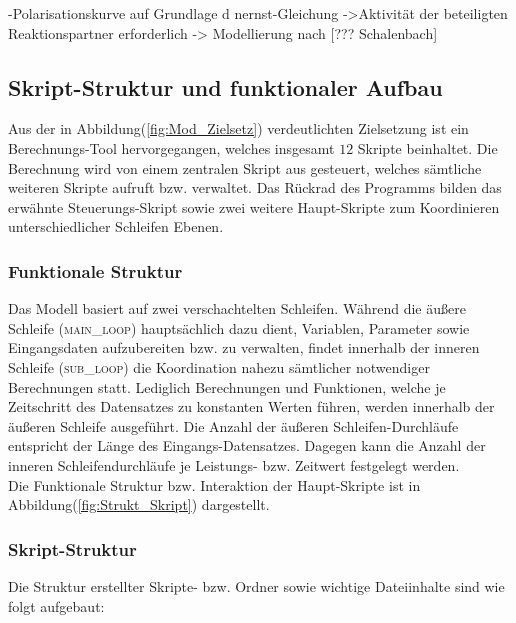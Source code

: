 \documentclass[onecolumn,10pt,titlepage]{article}
\begin{document}



-Polarisationskurve auf Grundlage d nernst-Gleichung
->Aktivität der beteiligten Reaktionspartner erforderlich
->
Modellierung nach [??? Schalenbach]



\subsection{Skript-Struktur und funktionaler Aufbau}
\label{subs_Skript-Strukt}
Aus der in Abbildung(\ref{fig:Mod_Zielsetz}) verdeutlichten Zielsetzung ist ein Berechnungs-Tool hervorgegangen, welches insgesamt $12$ Skripte beinhaltet.
Die Berechnung wird von einem zentralen Skript aus gesteuert, welches sämtliche weiteren Skripte aufruft bzw. verwaltet. Das Rückrad des Programms bilden das erwähnte Steuerungs-Skript sowie zwei weitere Haupt-Skripte zum Koordinieren unterschiedlicher Schleifen Ebenen. 

\subsubsection{Funktionale Struktur}
\label{subs_Funkt-Strukt}
Das Modell basiert auf zwei verschachtelten Schleifen. Während die äußere Schleife (\textsc{main\_loop}) hauptsächlich dazu dient, Variablen, Parameter sowie Eingangsdaten aufzubereiten bzw. zu verwalten, findet innerhalb der inneren Schleife (\textsc{sub\_loop}) die Koordination nahezu sämtlicher notwendiger Berechnungen statt. Lediglich Berechnungen und Funktionen, welche je Zeitschritt des Datensatzes zu konstanten Werten führen, werden innerhalb der äußeren Schleife ausgeführt. Die Anzahl der äußeren Schleifen-Durchläufe entspricht der Länge des Eingangs-Datensatzes. Dagegen kann die Anzahl der inneren Schleifendurchläufe je Leistungs- bzw. Zeitwert festgelegt werden.\\

Die Funktionale Struktur bzw. Interaktion der Haupt-Skripte ist in Abbildung(\ref{fig:Strukt_Skript}) dargestellt. 

\subsubsection{Skript-Struktur}
\label{subsubs_skrpt-strukt}
Die Struktur erstellter Skripte- bzw. Ordner sowie wichtige Dateiinhalte sind wie folgt aufgebaut:
\end{document}
